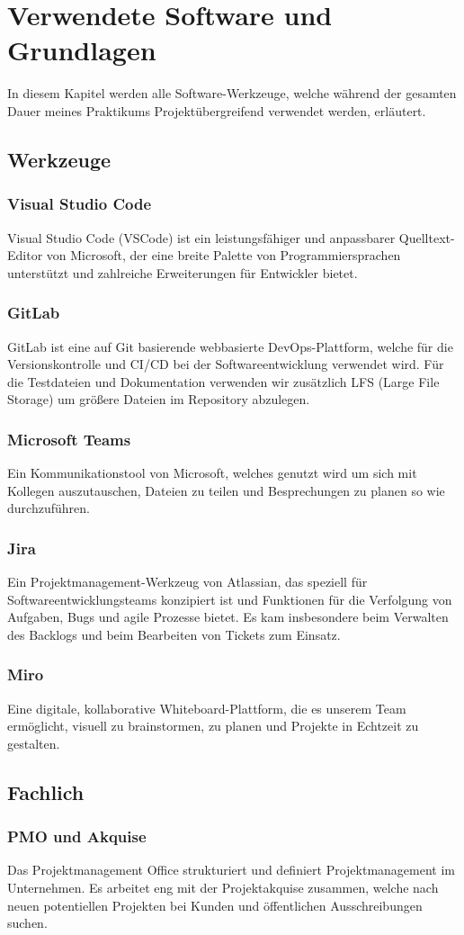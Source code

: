 \section{Verwendete Software und Grundlagen}
In diesem Kapitel werden alle Software-Werkzeuge, welche während der gesamten Dauer meines Praktikums Projektübergreifend
verwendet werden, erläutert.


\subsection{Werkzeuge}

\subsubsection{Visual Studio Code}
Visual Studio Code (VSCode) ist ein leistungsfähiger und anpassbarer Quelltext-Editor von Microsoft, der eine breite
Palette von Programmiersprachen unterstützt und zahlreiche Erweiterungen für Entwickler bietet. 

\subsubsection{GitLab}
GitLab ist eine auf Git basierende webbasierte DevOps-Plattform, welche für die Versionskontrolle und CI/CD bei der
Softwareentwicklung verwendet wird. Für die Testdateien und Dokumentation verwenden wir zusätzlich LFS (Large File
Storage) um größere Dateien im Repository abzulegen.

\subsubsection{Microsoft Teams}
Ein Kommunikationstool von Microsoft, welches genutzt wird um sich mit Kollegen auszutauschen, Dateien zu teilen und
Besprechungen zu planen so wie durchzuführen.

\subsubsection{Jira}
Ein Projektmanagement-Werkzeug von Atlassian, das speziell für Softwareentwicklungsteams konzipiert ist und Funktionen
für die Verfolgung von Aufgaben, Bugs und agile Prozesse bietet. Es kam insbesondere beim Verwalten des Backlogs und
beim Bearbeiten von Tickets zum Einsatz.

\subsubsection{Miro}
Eine digitale, kollaborative Whiteboard-Plattform, die es unserem Team ermöglicht, visuell zu brainstormen, zu planen
und Projekte in Echtzeit zu gestalten.

\subsection{Fachlich}

\subsubsection{PMO und Akquise}
Das Projektmanagement Office strukturiert und definiert Projektmanagement im Unternehmen. Es arbeitet eng mit der
Projektakquise zusammen, welche nach neuen potentiellen Projekten bei Kunden und öffentlichen Ausschreibungen suchen.